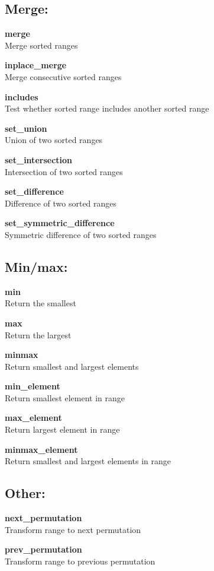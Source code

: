 \documentclass[table]{article}
\begin{document}
\begin{multicols}{2}
	\subsection*{Merge:}
	
	\textbf{merge}\\
	Merge sorted ranges
	
	\textbf{inplace\_merge}\\
	Merge consecutive sorted ranges
	
	\textbf{includes}\\
	Test whether sorted range includes another sorted range
	
	\textbf{set\_union}\\
	Union of two sorted ranges
	
	\textbf{set\_intersection}\\
	Intersection of two sorted ranges
	
	\textbf{set\_difference}\\
	Difference of two sorted ranges
	
	\textbf{set\_symmetric\_difference}\\
	Symmetric difference of two sorted ranges
	
	\subsection*{Min/max:}
	
	\textbf{min}\\
	Return the smallest
	
	\textbf{max}\\
	Return the largest
	
	\textbf{minmax}\\
	Return smallest and largest elements
	
	\textbf{min\_element}\\
	Return smallest element in range
	
	\textbf{max\_element}\\
	Return largest element in range
	
	\textbf{minmax\_element}\\
	Return smallest and largest elements in range
	
	\subsection*{Other:}
	
	\textbf{next\_permutation}\\
	Transform range to next permutation
	
	\textbf{prev\_permutation}\\
	Transform range to previous permutation
	
	\end{multicols}
	\pagebreak
	
	\Large
\end{document}
